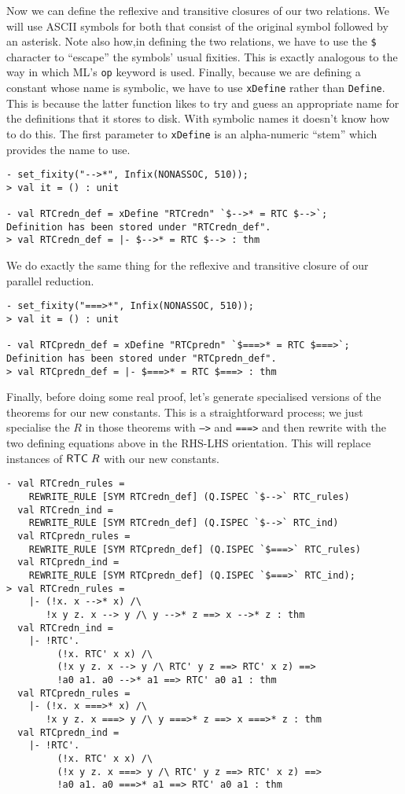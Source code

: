 \documentclass[12pt]{article}
\begin{document}
Now we can define the reflexive and transitive closures of our two
relations.  We will use ASCII symbols for both that consist of the
original symbol followed by an asterisk.  Note also how,in
defining the two relations, we have to use the \texttt{\$} character
to ``escape'' the symbols' usual fixities.  This is exactly analogous
to the way in which ML's \texttt{op} keyword is used.  Finally,
because we are defining a constant whose name is symbolic, we have to
use \texttt{xDefine} rather than \texttt{Define}.  This is because the
latter function likes to try and guess an appropriate name for the
definitions that it stores to disk.  With symbolic names it doesn't
know how to do this.  The first parameter to \texttt{xDefine} is an
alpha-numeric ``stem'' which provides the name to use.
\begin{session}\begin{verbatim}
- set_fixity("-->*", Infix(NONASSOC, 510));
> val it = () : unit

- val RTCredn_def = xDefine "RTCredn" `$-->* = RTC $-->`;
Definition has been stored under "RTCredn_def".
> val RTCredn_def = |- $-->* = RTC $--> : thm
\end{verbatim}\end{session}
We do exactly the same thing for the reflexive and transitive closure
of our parallel reduction.
\begin{session}\begin{verbatim}
- set_fixity("===>*", Infix(NONASSOC, 510));
> val it = () : unit

- val RTCpredn_def = xDefine "RTCpredn" `$===>* = RTC $===>`;
Definition has been stored under "RTCpredn_def".
> val RTCpredn_def = |- $===>* = RTC $===> : thm
\end{verbatim}\end{session}
Finally, before doing some real proof, let's generate specialised
versions of the  theorems for our new constants.  This is a
straightforward process; we just specialise the $R$ in those theorems
with \texttt{-->} and \texttt{===>} and then rewrite with the two
defining equations above in the RHS-LHS orientation.  This will
replace instances of ${\sf RTC}\;R$ with our new constants.
\begin{session}\begin{verbatim}
- val RTCredn_rules =
    REWRITE_RULE [SYM RTCredn_def] (Q.ISPEC `$-->` RTC_rules)
  val RTCredn_ind =
    REWRITE_RULE [SYM RTCredn_def] (Q.ISPEC `$-->` RTC_ind)
  val RTCpredn_rules =
    REWRITE_RULE [SYM RTCpredn_def] (Q.ISPEC `$===>` RTC_rules)
  val RTCpredn_ind =
    REWRITE_RULE [SYM RTCpredn_def] (Q.ISPEC `$===>` RTC_ind);
> val RTCredn_rules =
    |- (!x. x -->* x) /\
       !x y z. x --> y /\ y -->* z ==> x -->* z : thm
  val RTCredn_ind =
    |- !RTC'.
         (!x. RTC' x x) /\
         (!x y z. x --> y /\ RTC' y z ==> RTC' x z) ==>
         !a0 a1. a0 -->* a1 ==> RTC' a0 a1 : thm
  val RTCpredn_rules =
    |- (!x. x ===>* x) /\
       !x y z. x ===> y /\ y ===>* z ==> x ===>* z : thm
  val RTCpredn_ind =
    |- !RTC'.
         (!x. RTC' x x) /\
         (!x y z. x ===> y /\ RTC' y z ==> RTC' x z) ==>
         !a0 a1. a0 ===>* a1 ==> RTC' a0 a1 : thm
\end{verbatim}\end{session}
\end{document}
